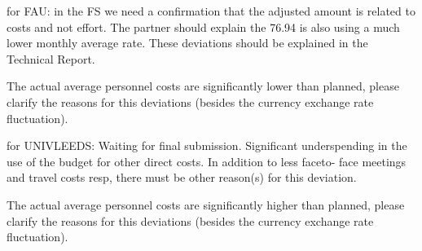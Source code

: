 for FAU:
in the FS we need a confirmation that the adjusted amount is related to costs and not effort.
The partner should explain the 76.94%
is also using a much lower monthly average rate. These deviations should be explained in the
Technical Report.

The actual average personnel costs are significantly lower than planned, 
please clarify the reasons for this deviations (besides the currency exchange rate fluctuation).

for UNIVLEEDS:
Waiting for final submission.
Significant underspending in the use of the budget for other direct costs. In addition to less faceto-
face meetings and travel costs resp, there must be other reason(s) for this deviation.

The actual average personnel costs are significantly higher than planned, 
please clarify the reasons for this deviations (besides the currency exchange rate fluctuation).


